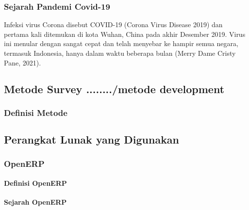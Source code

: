 \subsubsection{Sejarah Pandemi Covid-19}
Infeksi virus Corona disebut COVID-19 (Corona Virus Disease 2019) dan pertama kali ditemukan di kota Wuhan, China pada akhir Desember 2019. Virus ini menular dengan sangat cepat dan telah menyebar ke hampir semua negara, termasuk Indonesia, hanya dalam waktu beberapa bulan (Merry Dame Cristy Pane, 2021).


\subsection{Metode Survey ......../metode development}
\subsubsection{Definisi Metode}


\subsection{Perangkat Lunak yang Digunakan}
\subsubsection{OpenERP}
\paragraph{Definisi OpenERP}
\paragraph{Sejarah OpenERP}
